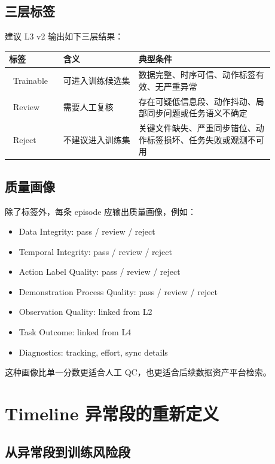 \documentclass[UTF8,zihao=-4]{ctexart}
\newcommand{\Pass}{\textcolor{PassGreen}{\ding{51}}}
\newcommand{\Warn}{\textcolor{WarnOrange}{\ding{115}}}
\newcommand{\Reject}{\textcolor{RejectRed}{\ding{55}}}
\begin{document}
\subsection{三层标签}

建议 L3 v2 输出如下三层结果：

\begin{longtable}{p{0.18\linewidth}p{0.25\linewidth}p{0.45\linewidth}}
\toprule
\textbf{标签} & \textbf{含义} & \textbf{典型条件} \\
\midrule
\Pass\ Trainable & 可进入训练候选集 & 数据完整、时序可信、动作标签有效、无严重异常 \\
\Warn\ Review & 需要人工复核 & 存在可疑低信息段、动作抖动、局部同步问题或任务语义不确定 \\
\Reject\ Reject & 不建议进入训练集 & 关键文件缺失、严重同步错位、动作标签损坏、任务失败或观测不可用 \\
\bottomrule
\end{longtable}

\subsection{质量画像}

除了标签外，每条 episode 应输出质量画像，例如：

\begin{itemize}
  \item Data Integrity: pass / review / reject
  \item Temporal Integrity: pass / review / reject
  \item Action Label Quality: pass / review / reject
  \item Demonstration Process Quality: pass / review / reject
  \item Observation Quality: linked from L2
  \item Task Outcome: linked from L4
  \item Diagnostics: tracking, effort, sync details
\end{itemize}

这种画像比单一分数更适合人工 QC，也更适合后续数据资产平台检索。

\section{Timeline 异常段的重新定义}

\subsection{从异常段到训练风险段}
\end{document}
